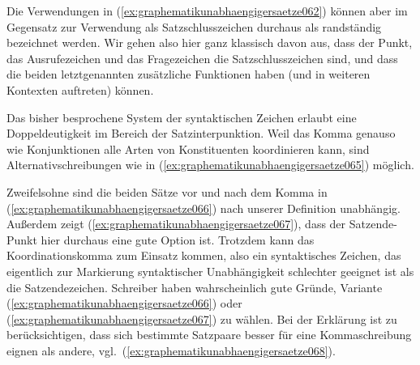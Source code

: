 Die Verwendungen in (\ref{ex:graphematikunabhaengigersaetze062}) können aber im Gegensatz zur Verwendung als Satzschlusszeichen durchaus als randständig bezeichnet werden.
Wir gehen also hier ganz klassisch davon aus, dass der Punkt, das Ausrufezeichen und das Fragezeichen die Satzschlusszeichen sind, und dass die beiden letztgenannten zusätzliche Funktionen haben (und in weiteren Kontexten auftreten) können.

Das bisher besprochene System der syntaktischen Zeichen erlaubt eine Doppeldeutigkeit im Bereich der Satzinterpunktion.
Weil das Komma genauso wie Konjunktionen alle Arten von Konstituenten koordinieren kann, sind Alternativschreibungen wie in (\ref{ex:graphematikunabhaengigersaetze065}) möglich.

\begin{exe}
  \ex\label{ex:graphematikunabhaengigersaetze065}
  \begin{xlist}
  \end{xlist}
\end{exe}

Zweifelsohne sind die beiden Sätze vor und nach dem Komma in (\ref{ex:graphematikunabhaengigersaetze066}) nach unserer Definition unabhängig.
Außerdem zeigt (\ref{ex:graphematikunabhaengigersaetze067}), dass der Satzende-Punkt hier durchaus eine gute Option ist.
Trotzdem kann das Koordinationskomma zum Einsatz kommen, also ein syntaktisches Zeichen, das eigentlich zur Markierung syntaktischer Unabhängigkeit schlechter geeignet ist als die Satzendezeichen.
Schreiber haben wahrscheinlich gute Gründe, Variante (\ref{ex:graphematikunabhaengigersaetze066}) oder (\ref{ex:graphematikunabhaengigersaetze067}) zu wählen.
Bei der Erklärung ist zu berücksichtigen, dass sich bestimmte Satzpaare besser für eine Kommaschreibung eignen als andere, vgl.\ (\ref{ex:graphematikunabhaengigersaetze068}).

\begin{exe}
  \ex\label{ex:graphematikunabhaengigersaetze068}
  \begin{xlist}
  \end{xlist}
\end{exe}

